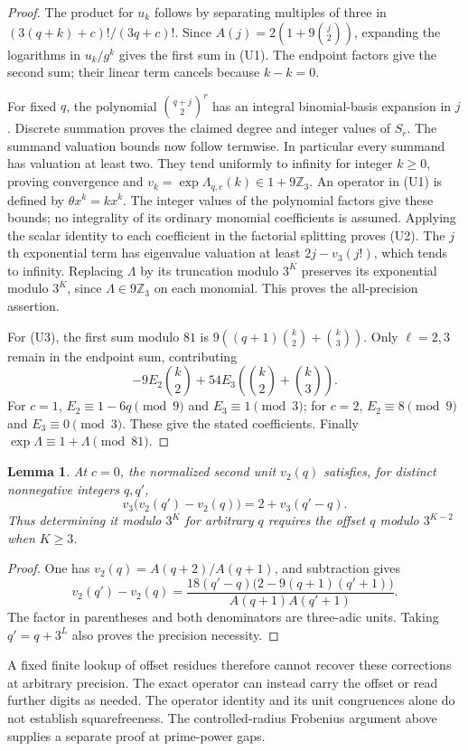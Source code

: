 \documentclass[11pt]{article}
\newtheorem{lemma}[theorem]{Lemma}
\begin{document}
\begin{proof}
The product for $u_k$ follows by separating multiples of three in
$(3(q+k)+c)!/(3q+c)!$. Since
$A(j)=2(1+9\binom j2)$, expanding the logarithms in
$u_k/g^k$ gives the first sum in (U1). The endpoint factors give
the second sum; their linear term cancels because $k-k=0$.

For fixed $q$, the polynomial $\binom{q+j}{2}^r$ has an integral
binomial-basis expansion in $j$. Discrete summation proves the
claimed degree and integer values of $S_r$.
The summand valuation bounds now follow termwise.
In particular every summand has valuation at least two.
They tend uniformly to infinity for integer $k\ge0$, proving
convergence and $v_k=\exp\Lambda_{q,c}(k)\in1+9\mathbb Z_3$.
An operator in (U1) is defined by $\theta x^k=kx^k$.
The integer values of the polynomial factors give these bounds;
no integrality of its ordinary monomial coefficients is assumed.
Applying the scalar identity to each coefficient in the factorial
splitting proves (U2).
The $j$th exponential term has eigenvalue valuation at least
$2j-v_3(j!)$, which tends to infinity.
Replacing $\Lambda$ by its truncation modulo $3^K$ preserves its
exponential modulo $3^K$, since $\Lambda\in9\mathbb Z_3$ on each
monomial. This proves the all-precision assertion.

For (U3), the first sum modulo $81$ is
$9((q+1)\binom k2+\binom k3)$.
Only $\ell=2,3$ remain in the endpoint sum, contributing
\[
 -9E_2\binom k2+
       54E_3\left(\binom k2+\binom k3\right).
\]
For $c=1$, $E_2\equiv1-6q\pmod9$ and $E_3\equiv1\pmod3$;
for $c=2$, $E_2\equiv8\pmod9$ and $E_3\equiv0\pmod3$.
These give the stated coefficients. Finally
$\exp\Lambda\equiv1+\Lambda\pmod{81}$.
\end{proof}

\begin{lemma}\label{lem:unit-offset-isometry}
At $c=0$, the normalized second unit $v_2(q)$ satisfies, for
distinct nonnegative integers $q,q'$,
\[
 v_3\bigl(v_2(q')-v_2(q)\bigr)=2+v_3(q'-q).                 \tag{U4}
\]
Thus determining it modulo $3^K$ for arbitrary $q$ requires the
offset $q$ modulo $3^{K-2}$ when $K\ge3$.
\end{lemma}
\begin{proof}
One has $v_2(q)=A(q+2)/A(q+1)$, and subtraction gives
\[
 v_2(q')-v_2(q)=
 \frac{18(q'-q)\bigl(2-9(q+1)(q'+1)\bigr)}
      {A(q+1)A(q'+1)}.
\]
The factor in parentheses and both denominators are three-adic
units. Taking $q'=q+3^L$ also proves the precision necessity.
\end{proof}
A fixed finite lookup of offset residues therefore cannot recover
these corrections at arbitrary precision. The exact operator can
instead carry the offset or read further digits as needed.
The operator identity and its unit congruences alone do not establish
squarefreeness. The controlled-radius Frobenius argument above supplies
a separate proof at prime-power gaps.
\end{document}
